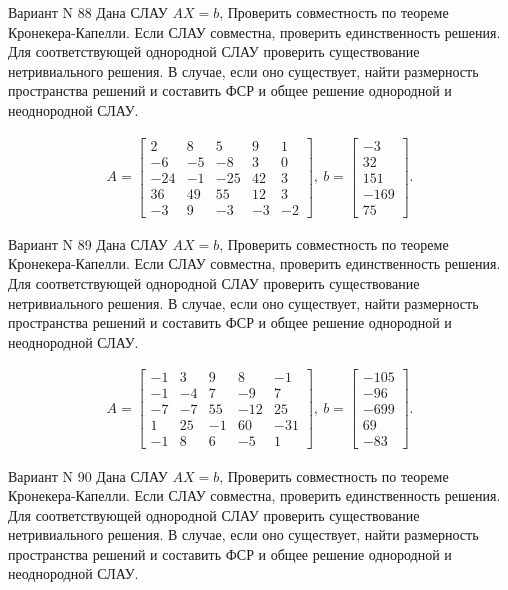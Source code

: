 \documentclass[11pt]{report}
\begin{document}
Вариант N 88
Дана СЛАУ $AX = b$,
Проверить совместность по теореме Кронекера-Капелли. Если СЛАУ совместна, проверить единственность решения.
Для соответствующей однородной СЛАУ проверить существование нетривиального решения. В случае, если оно существует,
найти размерность пространства решений и составить ФСР и общее решение однородной  и неоднородной СЛАУ.


\begin{align*}
 A = \left[\begin{matrix}2 & 8 & 5 & 9 & 1\\-6 & -5 & -8 & 3 & 0\\-24 & -1 & -25 & 42 & 3\\36 & 49 & 55 & 12 & 3\\-3 & 9 & -3 & -3 & -2\end{matrix}\right],
\ b = \left[\begin{matrix}-3\\32\\151\\-169\\75\end{matrix}\right]. 
 \end{align*}

Вариант N 89
Дана СЛАУ $AX = b$,
Проверить совместность по теореме Кронекера-Капелли. Если СЛАУ совместна, проверить единственность решения.
Для соответствующей однородной СЛАУ проверить существование нетривиального решения. В случае, если оно существует,
найти размерность пространства решений и составить ФСР и общее решение однородной  и неоднородной СЛАУ.


\begin{align*}
 A = \left[\begin{matrix}-1 & 3 & 9 & 8 & -1\\-1 & -4 & 7 & -9 & 7\\-7 & -7 & 55 & -12 & 25\\1 & 25 & -1 & 60 & -31\\-1 & 8 & 6 & -5 & 1\end{matrix}\right],
\ b = \left[\begin{matrix}-105\\-96\\-699\\69\\-83\end{matrix}\right]. 
 \end{align*}

Вариант N 90
Дана СЛАУ $AX = b$,
Проверить совместность по теореме Кронекера-Капелли. Если СЛАУ совместна, проверить единственность решения.
Для соответствующей однородной СЛАУ проверить существование нетривиального решения. В случае, если оно существует,
найти размерность пространства решений и составить ФСР и общее решение однородной  и неоднородной СЛАУ.
\end{document}
